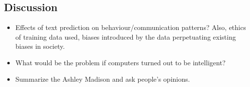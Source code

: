 \documentclass[12pt]{article}
\theoremstyle{definition}
\theoremstyle{plain}
\begin{document}
\subsection{Discussion}
\begin{itemize}
    \item Effects of text prediction on behaviour/communication patterns? Also,
        ethics of training data used, biases introduced by the data perpetuating
        existing biases in society.
    \item What would be the problem if computers turned out to be intelligent?

    \item Summarize the Ashley Madison and ask people's opinions.
\end{itemize}
\end{document}
